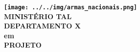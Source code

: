 \begin{center}
   		\textbf{\texttt{[image: ../../img/armas\_nacionais.png]}\\
   			MINISTÉRIO TAL\\
   			DEPARTAMENTO X\\}
   		\vspace{3ex}
   		\textbf{\MakeUppercase{\titulo} em \gdh} \\
   		\vspace{1.5ex}
   		\textbf{PROJETO \nomeProjeto}
\end{center}
